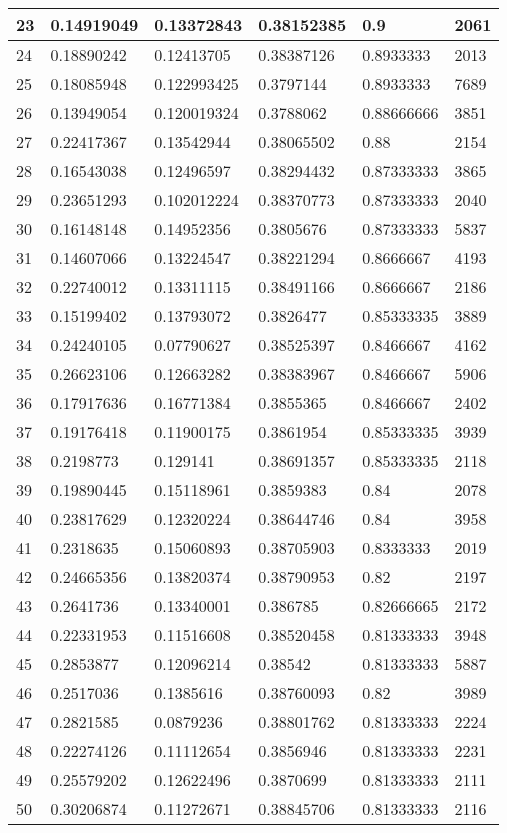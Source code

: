 \begin{longtable}{|l|l|l|l|l|l|}
23 & 0.14919049 & 0.13372843 & 0.38152385 & 0.9 & 2061 \\ \hline 
24 & 0.18890242 & 0.12413705 & 0.38387126 & 0.8933333 & 2013 \\ \hline 
25 & 0.18085948 & 0.122993425 & 0.3797144 & 0.8933333 & 7689 \\ \hline 
26 & 0.13949054 & 0.120019324 & 0.3788062 & 0.88666666 & 3851 \\ \hline 
27 & 0.22417367 & 0.13542944 & 0.38065502 & 0.88 & 2154 \\ \hline 
28 & 0.16543038 & 0.12496597 & 0.38294432 & 0.87333333 & 3865 \\ \hline 
29 & 0.23651293 & 0.102012224 & 0.38370773 & 0.87333333 & 2040 \\ \hline 
30 & 0.16148148 & 0.14952356 & 0.3805676 & 0.87333333 & 5837 \\ \hline 
31 & 0.14607066 & 0.13224547 & 0.38221294 & 0.8666667 & 4193 \\ \hline 
32 & 0.22740012 & 0.13311115 & 0.38491166 & 0.8666667 & 2186 \\ \hline 
33 & 0.15199402 & 0.13793072 & 0.3826477 & 0.85333335 & 3889 \\ \hline 
34 & 0.24240105 & 0.07790627 & 0.38525397 & 0.8466667 & 4162 \\ \hline 
35 & 0.26623106 & 0.12663282 & 0.38383967 & 0.8466667 & 5906 \\ \hline 
36 & 0.17917636 & 0.16771384 & 0.3855365 & 0.8466667 & 2402 \\ \hline 
37 & 0.19176418 & 0.11900175 & 0.3861954 & 0.85333335 & 3939 \\ \hline 
38 & 0.2198773 & 0.129141 & 0.38691357 & 0.85333335 & 2118 \\ \hline 
39 & 0.19890445 & 0.15118961 & 0.3859383 & 0.84 & 2078 \\ \hline 
40 & 0.23817629 & 0.12320224 & 0.38644746 & 0.84 & 3958 \\ \hline 
41 & 0.2318635 & 0.15060893 & 0.38705903 & 0.8333333 & 2019 \\ \hline 
42 & 0.24665356 & 0.13820374 & 0.38790953 & 0.82 & 2197 \\ \hline 
43 & 0.2641736 & 0.13340001 & 0.386785 & 0.82666665 & 2172 \\ \hline 
44 & 0.22331953 & 0.11516608 & 0.38520458 & 0.81333333 & 3948 \\ \hline 
45 & 0.2853877 & 0.12096214 & 0.38542 & 0.81333333 & 5887 \\ \hline 
46 & 0.2517036 & 0.1385616 & 0.38760093 & 0.82 & 3989 \\ \hline 
47 & 0.2821585 & 0.0879236 & 0.38801762 & 0.81333333 & 2224 \\ \hline 
48 & 0.22274126 & 0.11112654 & 0.3856946 & 0.81333333 & 2231 \\ \hline 
49 & 0.25579202 & 0.12622496 & 0.3870699 & 0.81333333 & 2111 \\ \hline 
50 & 0.30206874 & 0.11272671 & 0.38845706 & 0.81333333 & 2116 \\ \hline 
\end{longtable}